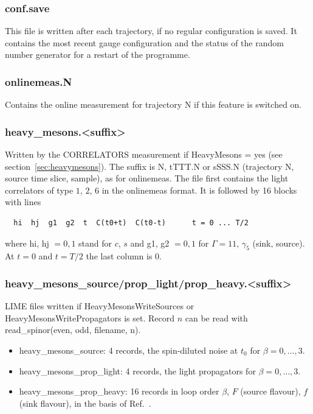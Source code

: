 \subsubsection*{\ttfamily conf.save}
This file is written after each trajectory, if no regular
configuration is saved. It contains the most recent gauge
configuration and the status of the random number generator for a
restart of the programme. 

\subsubsection*{\ttfamily onlinemeas.N}
Contains the online measurement for trajectory {\ttfamily N} if this
feature is switched on.

\subsubsection*{\ttfamily heavy\_mesons.<suffix>}
Written by the {\ttfamily CORRELATORS} measurement if {\ttfamily HeavyMesons = yes}
(see section~\ref{sec:heavymesons}).
The suffix is {\ttfamily N}, {\ttfamily tTTT.N} or {\ttfamily sSSS.N}
(trajectory {\ttfamily N}, source time slice, sample), as for {\ttfamily onlinemeas}.
The file first contains the light correlators of type $1$, $2$, $6$ in the
{\ttfamily onlinemeas} format. It is followed by 16 blocks with lines
\begin{verbatim}
  hi  hj  g1  g2  t  C(t0+t)  C(t0-t)      t = 0 ... T/2
\end{verbatim}
where {\ttfamily hi}, {\ttfamily hj} $=0,1$ stand for $c$, $s$
and {\ttfamily g1}, {\ttfamily g2} $=0,1$ for $\Gamma=1\!\!1$, $\gamma_5$
(sink, source). At $t=0$ and $t=T/2$ the last column is $0$.

\subsubsection*{\ttfamily heavy\_mesons\_source/prop\_light/prop\_heavy.<suffix>}
LIME files written if {\ttfamily HeavyMesonsWriteSources} or {\ttfamily HeavyMesonsWritePropagators}
is set. Record $n$ can be read with {\ttfamily read\_spinor(even, odd, filename, n)}.
\begin{itemize}
\item {\ttfamily heavy\_mesons\_source}: 4 records, the spin-diluted noise at $t_0$ for $\beta=0,\dots,3$.
\item {\ttfamily heavy\_mesons\_prop\_light}: 4 records, the light propagators for $\beta=0,\dots,3$.
\item {\ttfamily heavy\_mesons\_prop\_heavy}: 16 records in loop order $\beta$, $F$ (source flavour),
  $f$ (sink flavour), in the basis of Ref.~\cite{baron2011computing}.
\end{itemize}


